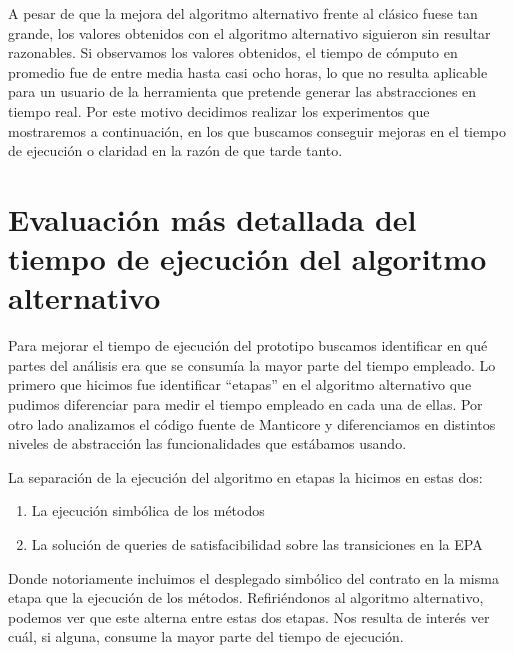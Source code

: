A pesar de que la mejora del algoritmo alternativo frente al clásico fuese tan grande, los valores obtenidos con el algoritmo alternativo siguieron sin resultar razonables.
Si observamos los valores obtenidos, el tiempo de cómputo en promedio fue de entre media hasta casi ocho horas, lo que no resulta aplicable para un usuario de la herramienta que pretende generar las abstracciones en tiempo real.
Por este motivo decidimos realizar los experimentos que mostraremos a continuación, en los que buscamos conseguir mejoras en el tiempo de ejecución o claridad en la razón de que tarde tanto.


\section{Evaluación más detallada del tiempo de ejecución del algoritmo alternativo}
Para mejorar el tiempo de ejecución del prototipo buscamos identificar en qué partes del análisis era que se consumía la mayor parte del tiempo empleado.
Lo primero que hicimos fue identificar ``etapas'' en el algoritmo alternativo que pudimos diferenciar para medir el tiempo empleado en cada una de ellas.
Por otro lado analizamos el código fuente de Manticore y diferenciamos en distintos niveles de abstracción las funcionalidades que estábamos usando.

La separación de la ejecución del algoritmo en etapas la hicimos en estas dos:
\begin{enumerate}
    \item La ejecución simbólica de los métodos
    \item La solución de queries de satisfacibilidad sobre las transiciones en la EPA
\end{enumerate}
Donde notoriamente incluimos el desplegado simbólico del contrato en la misma etapa que la ejecución de los métodos.
Refiriéndonos al algoritmo alternativo, podemos ver que este alterna entre estas dos etapas.
Nos resulta de interés ver cuál, si alguna, consume la mayor parte del tiempo de ejecución.

